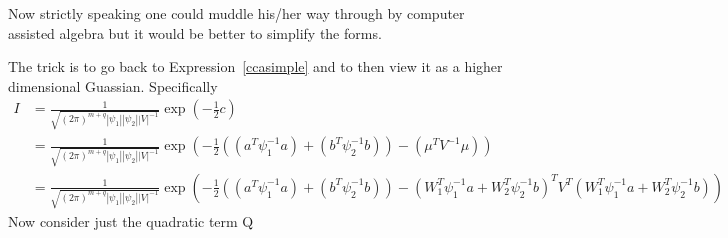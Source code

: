\documentclass[11pt]{article}
\renewcommand{\det}[1]{|#1|}
\newcommand{\mf}{-\frac{1}{2}}
\begin{document}
Now strictly speaking one could muddle his/her way through by computer
assisted algebra but it would be better to simplify the forms.

The trick is to go back to Expression~\ref{ccasimple} and to then
view it as a higher dimensional Guassian. Specifically
\begin{align}
  I &= \frac{1}{\sqrt{(2\pi)^{m+q}\det{\psi_1}\det{\psi_2}\det{V}^{-1}}}\exp(\mf c)\\
  &=
  \frac{1}{\sqrt{(2\pi)^{m+q}\det{\psi_1}\det{\psi_2}\det{V}^{-1}}}\exp(\mf
  ((a^T\psi_1^{-1}a) + (b^T\psi_2^{-1}b)) - (\mu^T V^{-1}\mu))\\
  &= \frac{1}{\sqrt{(2\pi)^{m+q}\det{\psi_1}\det{\psi_2}\det{V}^{-1}}}\exp(\mf ((a^T\psi_1^{-1}a) + (b^T\psi_2^{-1}b)) - (W_1^T\psi_1^{-1}a + W_2^T\psi_2^{-1}b)^T V^T(W_1^T\psi_1^{-1}a + W_2^T\psi_2^{-1}b))
\end{align}
Now consider just the quadratic term Q
\end{document}
